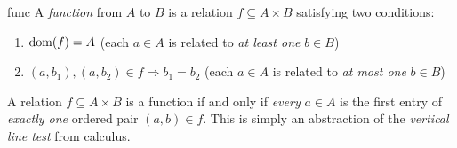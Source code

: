 \begin{defn}{}{func}
	A \emph{function} from $A$ to $B$ is a relation $f\subseteq A\times B$ satisfying two conditions:
	\begin{enumerate}
	  \item $\operatorname{dom}(f)=A$ \hfill (each $a\in A$ is related to \emph{at least one} $b\in B$)
	  \item $(a,b_1),(a,b_2)\in f\Longrightarrow b_1=b_2$ \hfill (each $a\in A$ is related to \emph{at most one} $b\in B$)
	\end{enumerate}
\end{defn}

A relation $f\subseteq A\times B$ is a function if and only if \emph{every} $a\in A$ is the first entry of \emph{exactly one} ordered pair $(a,b)\in f$. This is simply an abstraction of the \emph{vertical line test} from calculus.

